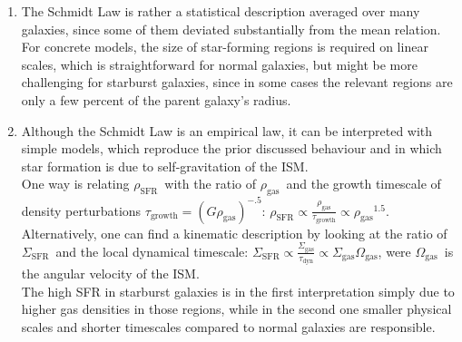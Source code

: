 \documentclass[11pt,a4paper]{scrartcl}
\newcommand{\SFR}{\ensuremath{\Sigma_{\mathrm{SFR}}}}
\newcommand{\ISM}{\ensuremath{\Sigma_{\mathrm{gas}}}}
\newcommand{\rhoSFR}{\ensuremath{\rho_{\mathrm{SFR}}}}
\newcommand{\rhoISM}{\ensuremath{\rho_{\mathrm{gas}}}}
\newcommand{\OmegaISM}{\ensuremath{\Omega_{\mathrm{gas}}}}
\newcommand{\tauDyn}{\ensuremath{\tau_{\mathrm{dyn}}}}
\newcommand{\tauGrowth}{\ensuremath{\tau_{\mathrm{growth}}}}
\begin{document}
\begin{enumerate}[label=\textbf{\large(\alph*)}, itemsep=.5\baselineskip]
\item
    The Schmidt Law is rather a statistical description averaged over many
    galaxies, since some of them deviated substantially from the mean
    relation. \\
    For concrete models, the size of star-forming regions is required on linear
    scales, which is straightforward for normal galaxies, but might be more
    challenging for starburst galaxies, since in some cases the relevant
    regions are only a few percent of the parent galaxy's radius.

\item
    Although the Schmidt Law is an empirical law, it can be interpreted with
    simple models, which reproduce the prior discussed behaviour and in which star
    formation is due to self-gravitation of the ISM. \\
    One way is relating \rhoSFR~with the ratio of \rhoISM~and the growth
    timescale of density
    perturbations $\tauGrowth=(G\rhoISM)^{-.5}$:
    $\rhoSFR\propto\frac{\rhoISM}{\tauGrowth}\propto\rhoISM^{1.5}$. \\
    Alternatively, one can find a kinematic description by looking at the
    ratio of \SFR~and the local dynamical timescale:
    $\SFR\propto\frac{\ISM}{\tauDyn}\propto\ISM\OmegaISM$, were
    \OmegaISM~is the angular velocity of the ISM. \\
    The high SFR in starburst galaxies is in the first interpretation simply
    due to higher gas densities in those regions, while in the second one
    smaller physical scales and shorter timescales compared to normal galaxies
    are responsible.



\end{enumerate}
\end{document}

